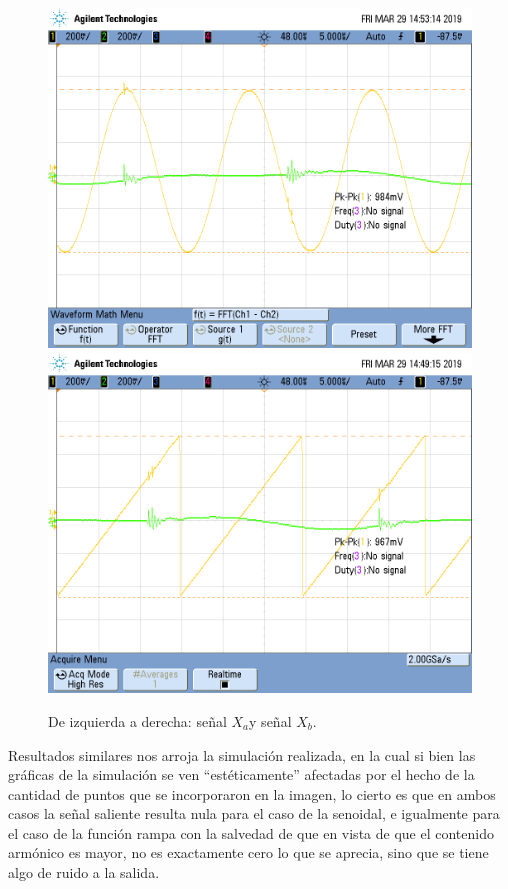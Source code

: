 \documentclass[../../ASSD_TP1_G7.tex]{subfiles}
\begin{document}
\begin{figure}[H]

\begin{centering}
\includegraphics[scale=0.25]{Imagenes/llave_senooo_pto_bf1}\includegraphics[scale=0.25]{Imagenes/llave_djente_pto_bfa}\caption{De izquierda a derecha: señal $X_{a}$y señal $X_{b}$.}
\par\end{centering}
\end{figure}

Resultados similares nos arroja la simulación realizada, en la cual
si bien las gráficas de la simulación se ven ``estéticamente'' afectadas
por el hecho de la cantidad de puntos que se incorporaron en la imagen,
lo cierto es que en ambos casos la señal saliente resulta nula para
el caso de la senoidal, e igualmente para el caso de la función rampa
con la salvedad de que en vista de que el contenido armónico es mayor,
no es exactamente cero lo que se aprecia, sino que se tiene algo de
ruido a la salida.
\end{document}
